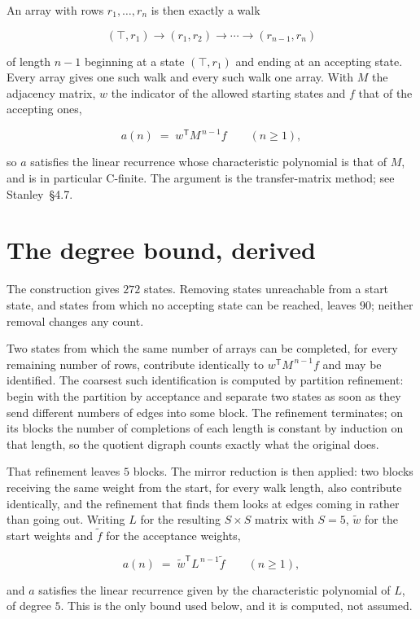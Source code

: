 \documentclass[11pt]{article}
\theoremstyle{definition}
\begin{document}
An array with rows $r_1,\dots,r_n$ is then exactly a walk

\[(\top,r_1) \to (r_1,r_2) \to \cdots \to (r_{n-1},r_n)\]

of length $n-1$ beginning at a state $(\top,r_1)$ and ending at an accepting state. Every array gives one such walk and every such walk one array. With $M$ the adjacency matrix, $w$ the indicator of the allowed starting states and $f$ that of the accepting ones,

\[a(n) \;=\; w^{\mathsf T} M^{\,n-1} f \qquad (n \ge 1),\]

so $a$ satisfies the linear recurrence whose characteristic polynomial is that of $M$, and is in particular C-finite. The argument is the transfer-matrix method; see Stanley~\S4.7.

\section{The degree bound, derived}

The construction gives $272$ states. Removing states unreachable from a start state, and states from which no accepting state can be reached, leaves $90$; neither removal changes any count.

Two states from which the same number of arrays can be completed, for every remaining number of rows, contribute identically to $w^{\mathsf T}M^{\,n-1}f$ and may be identified. The coarsest such identification is computed by partition refinement: begin with the partition by acceptance and separate two states as soon as they send different numbers of edges into some block. The refinement terminates; on its blocks the number of completions of each length is constant by induction on that length, so the quotient digraph counts exactly what the original does.

That refinement leaves $5$ blocks. The mirror reduction is then applied: two blocks receiving the same weight from the start, for every walk length, also contribute identically, and the refinement that finds them looks at edges coming in rather than going out. Writing $L$ for the resulting $S \times S$ matrix with $S = 5$, $\tilde w$ for the start weights and $\tilde f$ for the acceptance weights,

\[a(n) \;=\; \tilde w^{\mathsf T} L^{\,n-1} \tilde f \qquad (n \ge 1),\]

and $a$ satisfies the linear recurrence given by the characteristic polynomial of $L$, of degree $5$. This is the only bound used below, and it is computed, not assumed.
\end{document}

